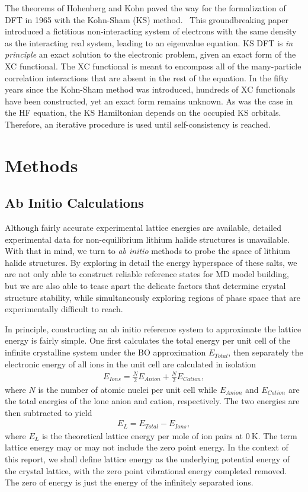 \documentclass[titlepage,11pt]{article}
\begin{document}
The theorems of Hohenberg and Kohn paved the way for the formalization of DFT in 1965 with the Kohn-Sham (KS) method.~\cite{kohn1965self} This groundbreaking paper introduced a fictitious non-interacting system of electrons with the same density as the interacting real system, leading to an eigenvalue equation. KS DFT is \textit{in principle} an exact solution to the electronic problem, given an exact form of the XC functional. The XC functional is meant to encompass all of the many-particle correlation interactions that are absent in the rest of the equation. In the fifty years since the Kohn-Sham method was introduced, hundreds of XC functionals have been constructed, yet an exact form remains unknown. As was the case in the HF equation, the KS Hamiltonian depends on the occupied KS orbitals. Therefore, an iterative procedure is used until self-consistency is reached. 

\section{Methods}

\subsection{Ab Initio Calculations}

Although fairly accurate experimental lattice energies are available, detailed experimental data for non-equilibrium lithium halide structures is unavailable. With that in mind, we turn to \textit{ab initio} methods to probe the space of lithium halide structures. By exploring in detail the energy hyperspace of these salts, we are not only able to construct reliable reference states for MD model building, but we are also able to tease apart the delicate factors that determine crystal structure stability, while simultaneously exploring regions of phase space that are experimentally difficult to reach.

In principle, constructing an ab initio reference system to approximate the lattice energy is fairly simple. One first calculates the total energy per unit cell of the infinite crystalline system under the BO approximation $E_{Total}$, then separately the electronic energy of all ions in the unit cell are calculated in isolation
\begin{align}
	E_{Ions} = \frac{N}{2} E_{Anion} + \frac{N}{2} E_{Cation},
	\label{eq:Ions}
\end{align}
where $N$ is the number of atomic nuclei per unit cell while $E_{Anion}$ and $E_{Cation}$ are the total energies of the lone anion and cation, respectively. The two energies are then subtracted to yield
\begin{align}
	E_{L} = E_{Total} - E_{Ions},
	\label{eq:lattice_energy}
\end{align}
where $E_{L}$ is the theoretical lattice energy per mole of ion pairs at $\SI{0}{\kelvin}$. The term lattice energy may or may not include the zero point energy. In the context of this report, we shall define lattice energy as the underlying potential energy of the crystal lattice, with the zero point vibrational energy completed removed. The zero of energy is just the energy of the infinitely separated ions.
\end{document}
